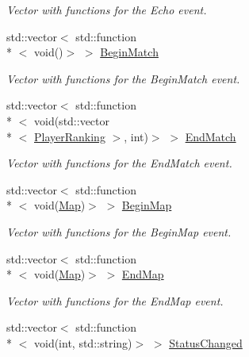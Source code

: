 \begin{DoxyCompactItemize}
\begin{DoxyCompactList}\small\item\em Vector with functions for the Echo event. \end{DoxyCompactList}\item 
\hypertarget{classPlugin_a83f8709eb14504c24e44792438fea9f8}{std\-::vector$<$ std\-::function\\*
$<$ void()$>$ $>$ \hyperlink{classPlugin_a83f8709eb14504c24e44792438fea9f8}{Begin\-Match}}\label{classPlugin_a83f8709eb14504c24e44792438fea9f8}

\begin{DoxyCompactList}\small\item\em Vector with functions for the Begin\-Match event. \end{DoxyCompactList}\item 
\hypertarget{classPlugin_a772ce957615c12fd06fdf3190b5c85f5}{std\-::vector$<$ std\-::function\\*
$<$ void(std\-::vector\\*
$<$ \hyperlink{structPlayerRanking}{Player\-Ranking} $>$, int)$>$ $>$ \hyperlink{classPlugin_a772ce957615c12fd06fdf3190b5c85f5}{End\-Match}}\label{classPlugin_a772ce957615c12fd06fdf3190b5c85f5}

\begin{DoxyCompactList}\small\item\em Vector with functions for the End\-Match event. \end{DoxyCompactList}\item 
\hypertarget{classPlugin_a2ba64350d1fcc5269e2f61a0e3725e33}{std\-::vector$<$ std\-::function\\*
$<$ void(\hyperlink{structMap}{Map})$>$ $>$ \hyperlink{classPlugin_a2ba64350d1fcc5269e2f61a0e3725e33}{Begin\-Map}}\label{classPlugin_a2ba64350d1fcc5269e2f61a0e3725e33}

\begin{DoxyCompactList}\small\item\em Vector with functions for the Begin\-Map event. \end{DoxyCompactList}\item 
\hypertarget{classPlugin_ad872750ef7512a9961bc7653a5d8056c}{std\-::vector$<$ std\-::function\\*
$<$ void(\hyperlink{structMap}{Map})$>$ $>$ \hyperlink{classPlugin_ad872750ef7512a9961bc7653a5d8056c}{End\-Map}}\label{classPlugin_ad872750ef7512a9961bc7653a5d8056c}

\begin{DoxyCompactList}\small\item\em Vector with functions for the End\-Map event. \end{DoxyCompactList}\item 
\hypertarget{classPlugin_a1d1a7c5ee8f037cc4277225994829902}{std\-::vector$<$ std\-::function\\*
$<$ void(int, std\-::string)$>$ $>$ \hyperlink{classPlugin_a1d1a7c5ee8f037cc4277225994829902}{Status\-Changed}}\label{classPlugin_a1d1a7c5ee8f037cc4277225994829902}


\end{DoxyCompactItemize}
